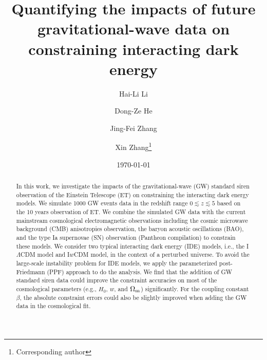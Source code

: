 \documentclass[aps,prd,nofootinbib,amsmath,amssymb,superscriptaddress,twocolumn,10pt]{revtex4}%
\begin{document}
\title{Quantifying the impacts of future gravitational-wave data on constraining interacting dark energy}

\author{Hai-Li Li}
\author{Dong-Ze He}
\author{Jing-Fei Zhang}
\author{}

\author{Xin Zhang\footnote{Corresponding author}}
\date{\today}

\begin{abstract}
In this work, we investigate the impacts of the gravitational-wave (GW) standard siren observation of the Einstein Telescope (ET) on constraining the interacting dark energy models. We simulate 1000 GW events data in the redshift range  $0\lesssim z \lesssim 5$ based on the 10 years observation of ET. We combine the simulated GW data with the current mainstream cosmological electromagnetic observations including the cosmic microwave background (CMB) anisotropies observation, the baryon acoustic oscillations (BAO), and the type Ia supernovae (SN) observation (Pantheon compilation) to constrain these models. We consider two typical interacting dark energy (IDE) models, i.e., the I$\Lambda$CDM model and I$w$CDM model, in the context of a perturbed universe. To avoid the large-scale instability problem for IDE models, we apply the parameterized post-Friedmann (PPF) approach to do the analysis. We find that the addition of GW standard siren data could improve the constraint accuracies on most of the cosmological parameters (e.g., $H_{0}$, $w$, and $\Omega_{\rm m}$) significantly. For the coupling constant $\beta$, the absolute constraint errors could also be slightly improved when adding the GW data in the cosmological fit.

\end{abstract}
\maketitle
\end{document}
